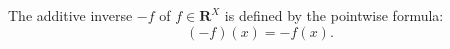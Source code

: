 The additive inverse $-f$ of $f \in \mathbf{R}^X$ is defined by the pointwise formula:
$$(-f)(x) = -f(x).$$
